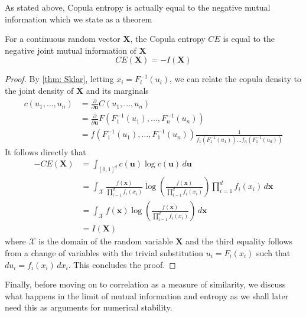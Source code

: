 \documentclass[../Thesis.tex]{subfiles}
\begin{document}
As stated above, Copula entropy is actually equal to the negative mutual information which we state as a theorem
\begin{theorem}\label{thm:copula entropy equals mutual information}
    For a continuous random vector $\boldsymbol{X}$, the Copula entropy $CE$ is equal to the negative joint mutual information of $\boldsymbol{X}$
    $$CE\left(\boldsymbol{X}\right) = - I\left(\boldsymbol{X}\right)$$
\end{theorem}
\begin{proof}
    By \autoref{thm: Sklar}, letting $x_i = F_i^{-1}\left(u_i\right)$, we can relate the copula density to the joint density of $\boldsymbol{X}$ and its marginals
    \begin{align*}
        c(u_1,\dots , u_n) & = \frac{\partial}{\partial \mathbf{u}} C(u_1,\dots,u_n)                                                                                                                   \\
                           & = \frac{\partial}{\partial \mathbf{u}} F\left(F_1^{-1}\left(u_1\right), \dots, F_n^{-1}\left(u_n\right)\right)                                                            \\
                           & = f\left(F_1^{-1}\left(u_1\right),\dots, F_1^{-1}\left(u_n\right)\right) \frac{1}{f_1\left(F_1^{-1}\left(u_1\right)\right)\dots f_n\left(F_1^{-1}\left(u_d\right)\right)}
    \end{align*}
    It follows directly that
    \begin{align*}
        -CE\left(\boldsymbol{X}\right) & = \int_{[0,1]^d} c\left(\boldsymbol{u}\right) \log c\left(\boldsymbol{u}\right) \, d\boldsymbol{u}                                                                                                                        \\
                                       & =  \int_{\mathcal{X}} \frac{f(\boldsymbol{x})}{\prod_{i=1}^{d} f_i\left(x_i\right)} \log\left(\frac{f(\boldsymbol{x})}{\prod_{i=1}^{d} f_i\left(x_i\right)}\right) \prod_{i=1}^{d} f_i\left(x_i\right) \, d\boldsymbol{x} \\
                                       & = \int_{\mathcal{X}} f(\boldsymbol{x}) \log\left(\frac{f(\boldsymbol{x})}{\prod_{i=1}^{d} f_i\left(x_i\right)}\right) \, d\boldsymbol{x}                                                                                  \\
                                       & = I\left(\boldsymbol{X}\right)
    \end{align*}
    where $\mathcal{X}$ is the domain of the random variable $\boldsymbol X$ and the third equality follows from a change of variables with the trivial substitution $u_i = F_i(x_i)$ such that $du_i = f_i(x_i)\,dx_i$. This concludes the proof.
\end{proof}
Finally, before moving on to correlation as a measure of similarity, we discuss what happens in the limit of mutual information and entropy as we shall later need this as arguments for numerical stability.
\end{document}

